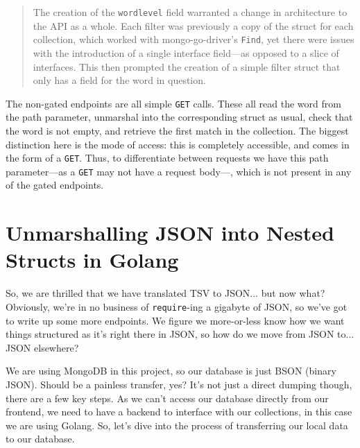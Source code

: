 \documentclass[11pt, twoside, reqno]{book}
\begin{document}
\begin{quote}
The creation of the \texttt{wordlevel} field warranted a change in architecture to the API as a whole. Each filter was previously a copy of the struct for each collection, which worked with mongo-go-driver's \texttt{Find}, yet there were issues with the introduction of a single interface field—as opposed to a slice of interfaces. This then prompted the creation of a simple filter struct that only has a field for the word in question.
\end{quote}

The non-gated endpoints are all simple \texttt{GET} calls. These all read the word from the path parameter, unmarshal into the corresponding struct as usual, check that the word is not empty, and retrieve the first match in the collection. The biggest distinction here is the mode of access: this is completely accessible, and comes in the form of a \texttt{GET}. Thus, to differentiate between requests we have this path parameter—as a \texttt{GET} may not have a request body—, which is not present in any of the gated endpoints.

\section{Unmarshalling JSON into Nested Structs in Golang}

So, we are thrilled that we have translated TSV to JSON... but now what? Obviously, we're in no business of \texttt{require}-ing a gigabyte of JSON, so we've got to write up some more endpoints. We figure we more-or-less know how we want things structured as it's right there in JSON, so how do we move from JSON to... \textit{}JSON elsewhere\textit{}?

We are using MongoDB in this project, so our database is just BSON (binary JSON). Should be a painless transfer, yes? It's not just a direct dumping though, there are a few key steps. As we can't access our database directly from our frontend, we need to have a backend to interface with our collections, in this case we are using Golang. So, let's dive into the process of transferring our local data to our database.
\end{document}
